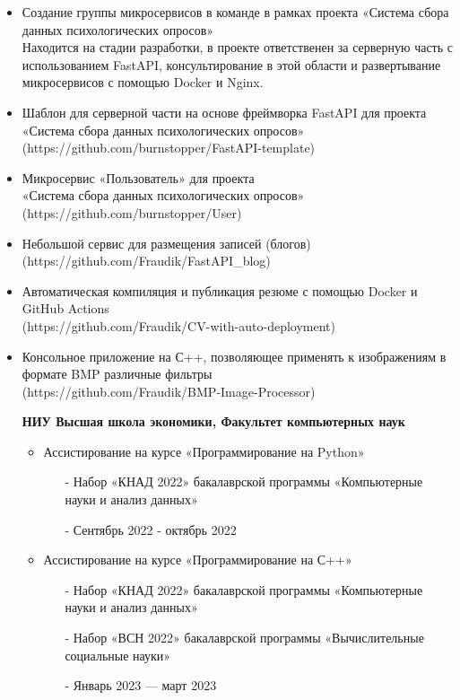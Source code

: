 \documentclass[10pt,a4paper]{altacv}
\begin{document}
\begin{itemize}
\item Создание группы микросервисов в команде в рамках проекта «Система сбора данных психологических опросов» \\
Находится на стадии разработки, в проекте ответственен за серверную часть с использованием FastAPI, консультирование в этой области и развертывание микросервисов с помощью Docker и Nginx. \\
\item Шаблон для серверной части на основе фреймворка FastAPI для проекта «Система сбора данных психологических опросов» \\
(https://github.com/burnstopper/FastAPI-template) \\
\item Микросервис «Пользователь» для проекта \\ «Система сбора данных психологических опросов» \\
(https://github.com/burnstopper/User) \\
\item Небольшой сервис для размещения записей (блогов)
(https://github.com/Fraudik/FastAPI\_blog) \\
\item Автоматическая компиляция и публикация резюме с помощью Docker и GitHub Actions \\
(https://github.com/Fraudik/CV-with-auto-deployment) \\
\item  Консольное приложение на С++, позволяющее применять к изображениям в формате BMP различные фильтры \\
(https://github.com/Fraudik/BMP-Image-Processor) \\
\end{itemize}

\begin{itemize}
\item[] \textbf{НИУ Высшая школа экономики, Факультет компьютерных наук}
\begin{itemize}
    \item Ассистирование на курсе «Программирование на Python»
    \begin{itemize}
        \item[-] Набор «КНАД 2022» бакалаврской программы «Компьютерные науки и анализ данных»
        \item[-] Сентябрь 2022 - октябрь 2022
    \end{itemize}
    \item Ассистирование на курсе «Программирование на С++»
    \begin{itemize}
        \item[-] Набор «КНАД 2022» бакалаврской программы «Компьютерные науки и анализ данных»
        \item[-] Набор «ВСН 2022» бакалаврской программы «Вычислительные социальные науки»
        \item[-] Январь 2023 --- март 2023
    \end{itemize}
\end{itemize}
\end{itemize}


\clearpage
\end{document}
